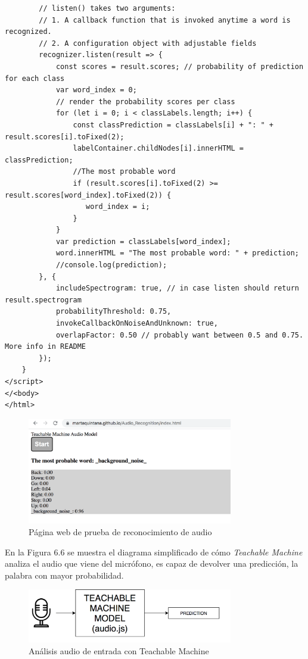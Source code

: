 \begin{lstlisting}
        // listen() takes two arguments:
        // 1. A callback function that is invoked anytime a word is recognized.
        // 2. A configuration object with adjustable fields
        recognizer.listen(result => {
            const scores = result.scores; // probability of prediction for each class
            var word_index = 0;
            // render the probability scores per class
            for (let i = 0; i < classLabels.length; i++) {
                const classPrediction = classLabels[i] + ": " + result.scores[i].toFixed(2);
                labelContainer.childNodes[i].innerHTML = classPrediction;
                //The most probable word
                if (result.scores[i].toFixed(2) >= result.scores[word_index].toFixed(2)) {
                   word_index = i;
                }
            }
            var prediction = classLabels[word_index];
            word.innerHTML = "The most probable word: " + prediction;
            //console.log(prediction);
        }, {
            includeSpectrogram: true, // in case listen should return result.spectrogram
            probabilityThreshold: 0.75,
            invokeCallbackOnNoiseAndUnknown: true,
            overlapFactor: 0.50 // probably want between 0.5 and 0.75. More info in README
        });
    }
</script>
</<body>
</html>
\end{lstlisting}

\begin{figure}[H]
    \centering
    \includegraphics[width=0.8\textwidth, height=0.4\textwidth]{chapters/images/audioprueba.png}
    \caption{Página web de prueba de reconocimiento de audio}
    \label{fig:my_label}
\end{figure}

En la Figura 6.6 se muestra el diagrama simplificado de cómo \textit{Teachable Machine} analiza el audio que viene del micrófono,  es capaz de devolver una predicción, la palabra con mayor probabilidad.
\begin{figure}[H]
    \centering
    \includegraphics[width=0.8\textwidth, height=0.2\textwidth]{chapters/images/diagrama2.png}
    \caption{Análisis audio de entrada con Teachable Machine}
    \label{fig:my_label}
\end{figure}

